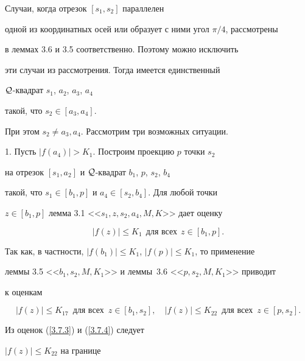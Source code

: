 \begin{pf}


Случаи, когда отрезок $[s_1, s_2]$ параллелен 


одной из координатных осей или образует с ними угол $\pi /4$, рассмотрены 


в леммах 3.6 и 3.5 соответственно. Поэтому можно исключить 


эти случаи из рассмотрения. Тогда имеется единственный 


${\cal Q}$-квадрат $s_1$, $a_2$, $a_3$, $a_4$


такой, что $s_2\in [a_3, a_4]$. 


При этом $s_2 \neq a_3, a_4$. Рассмотрим три возможных ситуации. 


\smallskip





1. Пусть $|f(a_4)| > K_1$. Построим проекцию $p$ точки $s_2$ 


на отрезок $[s_1, a_2]$ и ${\cal Q}$-квадрат $b_1$, $p$, $s_2$, $b_4$ 


такой, что $s_1\in [b_1, p]$ и $a_4 \in [s_2, b_4]$. Для любой точки 


$z\in [b_1, p]$ лемма 3.1 <<$s_1, z, s_2, a_4, M, K$>> дает оценку 


\begin{equation} 


\label{3.7.3}


|f(z)|\leq K_1 \ \ \text{для всех} \ \ z\in [b_1, p].


\end{equation}


Так как, в частности, $|f(b_1)|\leq K_1$, $|f(p)|\leq K_1$, то применение 


леммы 3.5 <<$b_1, s_2, M, K_1$>> и лем\-мы~3.6 <<$p, s_2, M, K_1$>> приводит 


к оценкам


\begin{equation}


\label{3.7.4}


|f(z)| \leq K_{17} \; \ \text{для всех} \; \ z\in [b_1, s_2], \quad


|f(z)| \leq K_{22} \; \ \text{для всех} \; \ z\in [p, s_2].


\end{equation}


Из оценок (\ref{3.7.3}) и (\ref{3.7.4}) следует


$|f(z)|\leq K_{22}$ на границе 



\end{pf}
